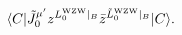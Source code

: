 \begin{equation}
 \langle C | {\tilde J}_0^{\mu'} z^{L_0^{\rm WZW}\vert_B}
             {\bar z}^{{\tilde L}_0^{\rm WZW}\vert_B}
 | C \rangle.
\end{equation}

